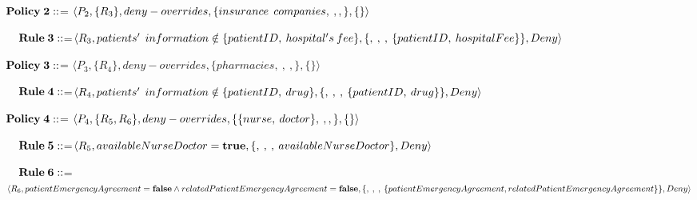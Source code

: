 \textit{$\textbf{Policy\:2}::$}= \textit{$\langle  P_2, \{R_3\}, deny-overrides, \{insurance\:\:companies,\: ,\\, \}, \{ \} \rangle$}


\textit{$\:\:\:\:\: \textbf{Rule\:3}::$}=\textit{$\langle R_3, patients' \:\: information \notin \{patientID,\:hospital's\\ \: fee\}, \{,\: ,\: ,\: \{patientID,\:hospitalFee\}\}, Deny \rangle$}



\textit{$\textbf{Policy\:3}::$}= \textit{$\langle  P_3, \{R_4\}, deny-overrides, \{pharmacies,\: ,\:, \}, \{ \} \rangle$}


\textit{$\:\:\:\:\: \textbf{Rule\:4}::$}=\textit{$\langle R_4, patients' \:\: information \notin \{patientID,\:drug\},\\ \{,\: ,\: ,\: \{patientID,\:drug\} \}, Deny \rangle$}



\textit{$\textbf{Policy\:4}::$}= \textit{$\langle  P_4, \{R_5, R_6\}, deny-overrides,  \{ \{ nurse,\: doctor\},\: ,\\ , \}, \{ \} \rangle$}


\textit{$\:\:\:\:\: \textbf{Rule\:5}::$}=\textit{$\langle R_5, availableNurseDoctor = \textbf{true}, \{,\: ,\: ,\: available\\NurseDoctor\}, Deny \rangle$}


\textit{$\:\:\:\:\: \textbf{Rule\:6}::$}=\textit{$\langle R_6, patientEmergencyAgreement = \textbf{false} \wedge related\\PatientEmergencyAgreement = \textbf{false}, \{,\: ,\: ,\: \{ patientEmergencyA\\greement, relatedPatientEmergencyAgreement\}\}, Deny \rangle$}


